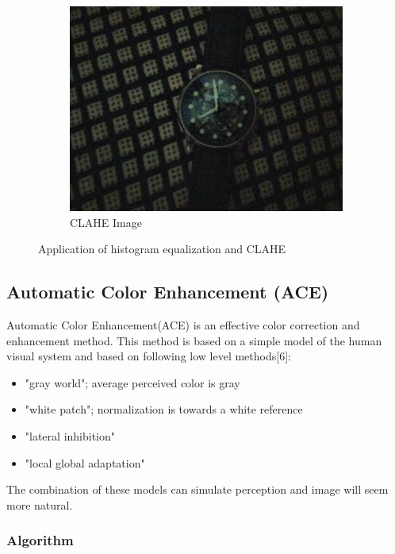 \documentclass[12pt, a4paper, font = Times New Roman]{article}
\begin{document}
\begin{figure}[!h]
\begin{subfigure}[b]{0.3\textwidth}
    \includegraphics[width=\textwidth]{clahe_watch.jpg}
    \caption{CLAHE Image}
    \label{fig:clahe_watch}
  \end{subfigure}
  \caption{Application of histogram equalization and CLAHE}
\end{figure}











\clearpage
\newpage
\subsection{Automatic Color Enhancement (ACE)}
\par
Automatic Color Enhancement(ACE) is an effective color correction and enhancement method. This method is based on a simple model of the human visual system and based on following low level methods[6]:
\begin{itemize}
	\item "gray world"; average perceived color is gray
    \item "white patch"; normalization is towards a white reference
	\item "lateral inhibition"
    \item "local global adaptation"
\end{itemize}
\par
The combination of these models can simulate perception and image will seem more natural.

\subsubsection{Algorithm}
\end{document}

